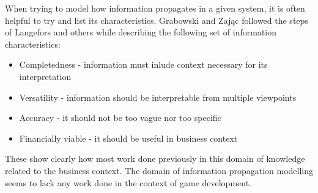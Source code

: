 When trying to model how information propagates in a given system, it is often helpful to try and list its characteristics.
Grabowski and Zając followed the steps of Langefors and others while describing the following set of information characteristics:
\begin{itemize}
    \item Completedness - information must inlude context necessary for its interpretation
    \item Versatility - information should be interpretable from multiple viewpoints
    \item Accuracy - it should not be too vague nor too specific
    \item Financially viable - it should be useful in business context
\end{itemize}
These show clearly how most work done previously in this domain of knowledge related to the business context.
The domain of information propagation modelling seems to lack any work done in the context of game development.